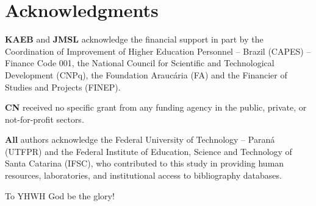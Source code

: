 \section*{Acknowledgments}

    \textbf{KAEB}  and  \textbf{JMSL}  acknowledge  the  financial  support  in  part   by   the
    Coordination of Improvement of Higher Education Personnel -- Brazil (CAPES) -- Finance  Code
    001,  the  National  Council  for  Scientific  and  Technological  Development  (CNPq),  the
    Foundation Araucária (FA) and the Financier of Studies and Projects (FINEP).

    \textbf{CN} received no specific grant from any funding agency in the  public,  private,  or
    not-for-profit sectors.

    \textbf{All} authors acknowledge the Federal University of Technology -- Paraná (UTFPR)  and
    the Federal Institute of Education, Science and Technology of  Santa  Catarina  (IFSC),  who
    contributed to this study in providing  human  resources,  laboratories,  and  institutional
    access to bibliography databases.

    To YHWH God be the glory!


